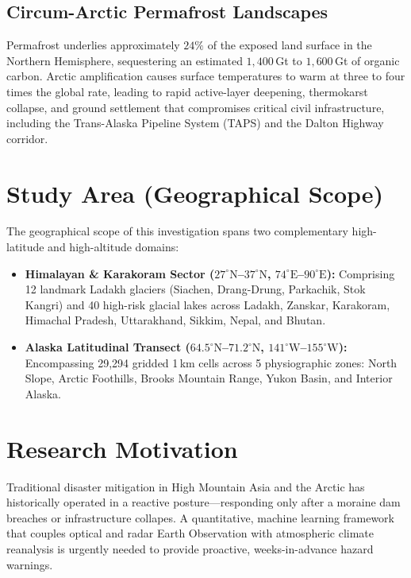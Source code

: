 \documentclass[12pt,a4paper]{report}
\begin{document}
\subsection{Circum-Arctic Permafrost Landscapes}
Permafrost underlies approximately $24\%$ of the exposed land surface in the Northern Hemisphere, sequestering an estimated $1,400$\,Gt to $1,600$\,Gt of organic carbon. Arctic amplification causes surface temperatures to warm at three to four times the global rate, leading to rapid active-layer deepening, thermokarst collapse, and ground settlement that compromises critical civil infrastructure, including the Trans-Alaska Pipeline System (TAPS) and the Dalton Highway corridor.

\section{Study Area (Geographical Scope)}
The geographical scope of this investigation spans two complementary high-latitude and high-altitude domains:
\begin{itemize}
    \item \textbf{Himalayan \& Karakoram Sector ($27^\circ\text{N}$--$37^\circ\text{N}$, $74^\circ\text{E}$--$90^\circ\text{E}$):} Comprising 12 landmark Ladakh glaciers (Siachen, Drang-Drung, Parkachik, Stok Kangri) and 40 high-risk glacial lakes across Ladakh, Zanskar, Karakoram, Himachal Pradesh, Uttarakhand, Sikkim, Nepal, and Bhutan.
    \item \textbf{Alaska Latitudinal Transect ($64.5^\circ\text{N}$--$71.2^\circ\text{N}$, $141^\circ\text{W}$--$155^\circ\text{W}$):} Encompassing 29,294 gridded 1\,km cells across 5 physiographic zones: North Slope, Arctic Foothills, Brooks Mountain Range, Yukon Basin, and Interior Alaska.
\end{itemize}

\section{Research Motivation}
Traditional disaster mitigation in High Mountain Asia and the Arctic has historically operated in a reactive posture---responding only after a moraine dam breaches or infrastructure collapes. A quantitative, machine learning framework that couples optical and radar Earth Observation with atmospheric climate reanalysis is urgently needed to provide proactive, weeks-in-advance hazard warnings.
\end{document}
